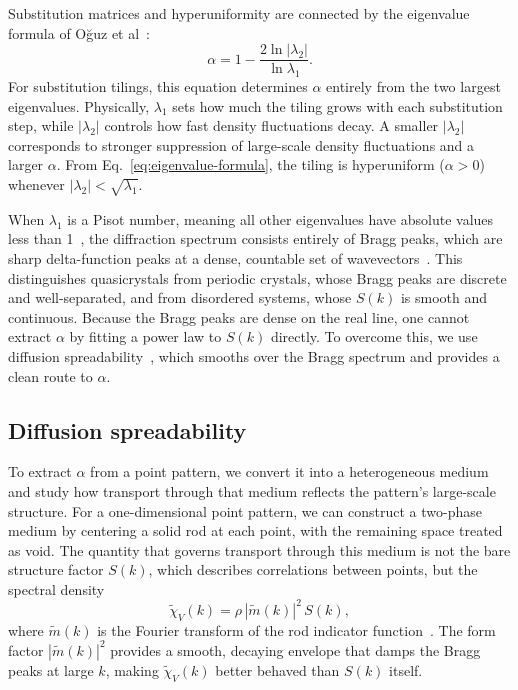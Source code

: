 \documentclass[11pt]{article}
\begin{document}
Substitution matrices and hyperuniformity are connected by the eigenvalue formula of Oğuz et al~\cite{oguz2017hyperuniform,oguz2019substitution}:
\begin{equation}
 \alpha = 1 - \frac{2\ln|\lambda_2|}{\ln\lambda_1}.
 \label{eq:eigenvalue-formula}
\end{equation}
For substitution tilings, this equation determines $\alpha$ entirely from the two largest eigenvalues. Physically, $\lambda_1$ sets how much the tiling grows with each substitution step, while $|\lambda_2|$ controls how fast density fluctuations decay. A smaller $|\lambda_2|$ corresponds to stronger suppression of large-scale density fluctuations and a larger $\alpha$. From Eq.~\eqref{eq:eigenvalue-formula}, the tiling is hyperuniform ($\alpha > 0$) whenever $|\lambda_2| < \sqrt{\lambda_1}$.

When $\lambda_1$ is a Pisot number, meaning all other eigenvalues have absolute values less than 1~\cite{oguz2019substitution}, the diffraction spectrum consists entirely of Bragg peaks, which are sharp delta-function peaks at a dense, countable set of wavevectors~\cite{oguz2019substitution}. This distinguishes quasicrystals from periodic crystals, whose Bragg peaks are discrete and well-separated, and from disordered systems, whose $S(k)$ is smooth and continuous. Because the Bragg peaks are dense on the real line, one cannot extract $\alpha$ by fitting a power law to $S(k)$ directly. To overcome this, we use diffusion spreadability~\cite{torquato2021spreadability,hitinbialus2024}, which smooths over the Bragg spectrum and provides a clean route to $\alpha$.

\subsection{Diffusion spreadability}
\label{sec:theory-spreadability}

To extract $\alpha$ from a point pattern, we convert it into a heterogeneous medium and study how transport through that medium reflects the pattern's large-scale structure. For a one-dimensional point pattern, we can construct a two-phase medium by centering a solid rod at each point, with the remaining space treated as void. The quantity that governs transport through this medium is not the bare structure factor $S(k)$, which describes correlations between points, but the spectral density
\begin{equation}
 \tilde\chi_V(k) = \rho\,|\tilde{m}(k)|^2\,S(k),
 \label{eq:spectral-density}
\end{equation}
where $\tilde{m}(k)$ is the Fourier transform of the rod indicator function~\cite{torquato2021spreadability}. The form factor $|\tilde{m}(k)|^2$ provides a smooth, decaying envelope that damps the Bragg peaks at large $k$, making $\tilde\chi_V(k)$ better behaved than $S(k)$ itself. 
\end{document}
